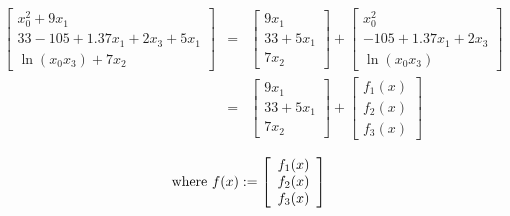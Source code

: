 \documentclass[11pt]{article}
\renewcommand{\_}{{\char"5F}}
\renewcommand{\{}{{\char"7B}}
\renewcommand{\}}{{\char"7D}}
\renewcommand{\^}{{\char"0D}}
\renewcommand{\'}{{\char"0D}}
\begin{document}
\begin{enumerate}[Step 1:]
\begin{eqnarray}
    \left[
        \begin{array}{r}
            x_0^2+9x_1 \\
            33 - 105 + 1.37x_1 + 2x_3 + 5x_1 \\
            \ln (x_0x_3) + 7x_2
        \end{array}
    \right]
&=&
    \left[
        \begin{array}{r}
            9x_1 \\
            33 + 5x_1 \\
            7x_2
        \end{array}
    \right]
+
    \left[
        \begin{array}{r}
            x_0^2 \\
            - 105 + 1.37x_1 + 2x_3  \\
            \ln (x_0x_3)
        \end{array}
    \right]
  \nonumber  \\
  &=&  \left[
        \begin{array}{r}
            9x_1 \\
            33 + 5x_1 \\
            7x_2
        \end{array}
    \right]
+
    \left[
        \begin{array}{r}
            f_1(x) \\
            f_2(x) \\
            f_3(x)
        \end{array}  \label{eq:definef1}
    \right]
\end{eqnarray}

\begin{eqnarray}
\hbox{\rm where}\ f(x) :=
%
    \left[
        \begin{array}{r}
            f_1(x) \\
            f_2(x) \\
            f_3(x)
        \end{array}   \label{eq:definef}
    \right]
\end{eqnarray}



\end{enumerate}
\end{document}
